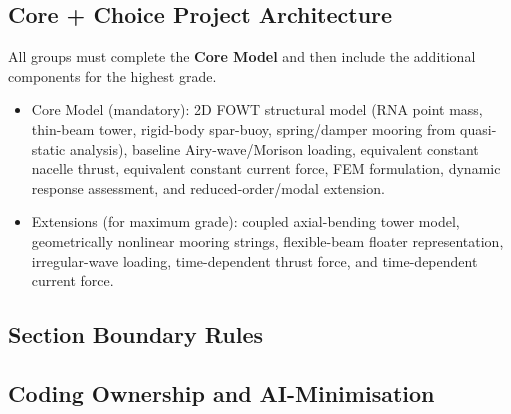 \documentclass[11pt,a4paper]{article}
\begin{document}
\subsection*{Core + Choice Project Architecture}
All groups must complete the \textbf{Core Model} and then include the additional components for the highest grade.
\begin{itemize}
    \item Core Model (mandatory): 2D FOWT structural model (RNA point mass, thin-beam tower, rigid-body spar-buoy, spring/damper mooring from quasi-static analysis), baseline Airy-wave/Morison loading, equivalent constant nacelle thrust, equivalent constant current force, FEM formulation, dynamic response assessment, and reduced-order/modal extension.
    \item Extensions (for maximum grade): coupled axial-bending tower model, geometrically nonlinear mooring strings, flexible-beam floater representation, irregular-wave loading, time-dependent thrust force, and time-dependent current force.
\end{itemize}

\subsection*{Section Boundary Rules}

\subsection*{Coding Ownership and AI-Minimisation}
\end{document}
